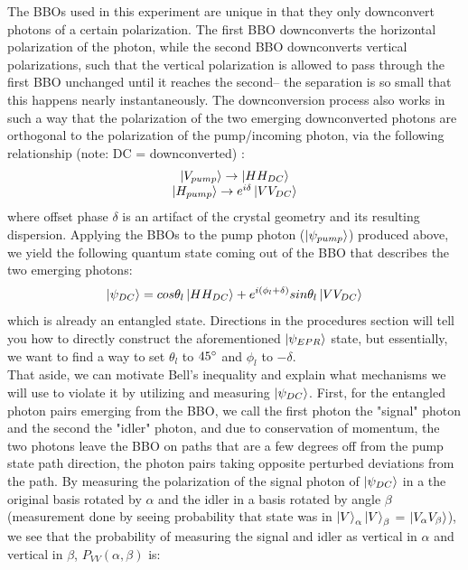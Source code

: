 \documentclass{article}
\begin{document}
    The BBOs used in this experiment are unique in that they only downconvert photons of a certain polarization. The first BBO downconverts the horizontal polarization of the photon, while the second BBO downconverts  vertical polarizations, such that the vertical polarization is allowed to pass through the first BBO unchanged until it reaches the second– the separation is so small that this happens nearly instantaneously. The downconversion process also works in such a way that the polarization of the two emerging downconverted photons are orthogonal to the polarization of the pump/incoming photon, via the following relationship (note: DC = downconverted) \cite{deh}:
    \begin{equation}
        \begin{array}{c}
            \left\vert{V_{pump}}\right\rangle \rightarrow \left\vert{HH_{DC}}\right\rangle\\
            \left\vert{H_{pump}}\right\rangle \rightarrow e^{i\delta}\left\vert{VV_{DC}}\right\rangle
        \end{array}
    \end{equation}
    where offset phase $\delta$ is an artifact of the crystal geometry and its resulting dispersion. Applying the BBOs to the pump photon ($\left\vert{\psi_{pump}}\right\rangle$) produced above, we yield the following quantum state coming out of the BBO that describes the two emerging photons:
    \begin{equation}
        \left\vert{\psi_{DC}}\right\rangle =  cos\theta_l\left\vert{HH_{DC}}\right\rangle + e^{i(\phi_l + \delta)}sin\theta_l\left\vert{VV_{DC}}\right\rangle
    \end{equation}
    which is already an entangled state. Directions in the procedures section will tell you how to directly construct the aforementioned $\left\vert{\psi_{EPR}}\right\rangle$ state, but essentially, we want to find a way to set $\theta_l$ to $45\degree$ and $\phi_l$ to $-\delta$.
    \\\indent That aside, we can motivate Bell's inequality and explain what mechanisms we will use to violate it by utilizing and measuring $\left\vert{\psi_{DC}}\right\rangle$. First, for the entangled photon pairs emerging from the BBO, we call the first photon the "signal" photon and the second the "idler" photon, and due to conservation of momentum, the two photons leave the BBO on paths that are a few degrees off from the pump state path direction, the photon pairs taking opposite perturbed deviations from the path. By measuring the polarization of the signal photon of $\left\vert{\psi_{DC}}\right\rangle$ in a the original basis rotated by $\alpha$ and the idler in a basis rotated by angle $\beta$ (measurement done by seeing probability that state was in $\left\vert{V}\right\rangle_\alpha\left\vert{V}\right\rangle_\beta$ = $\left\vert{V_\alpha V_\beta}\right\rangle$), we see that the probability of measuring the signal and idler as vertical in $\alpha$ and vertical in $\beta$, $P_{VV}(\alpha,\beta)$ is:
\end{document}

